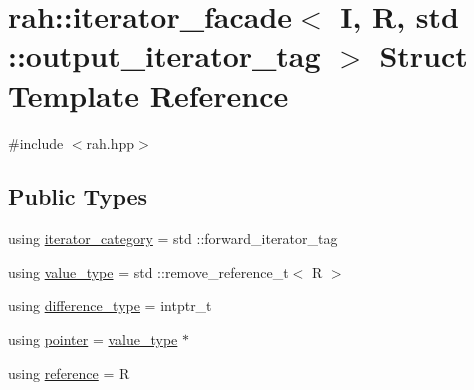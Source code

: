 \hypertarget{structrah_1_1iterator__facade_3_01_i_00_01_r_00_01std_01_1_1output__iterator__tag_01_4}{}\section{rah\+::iterator\+\_\+facade$<$ I, R, std \+::output\+\_\+iterator\+\_\+tag $>$ Struct Template Reference}
\label{structrah_1_1iterator__facade_3_01_i_00_01_r_00_01std_01_1_1output__iterator__tag_01_4}


{\ttfamily \#include $<$rah.\+hpp$>$}

\subsection*{Public Types}
\begin{DoxyCompactItemize}
\item 
using \mbox{\hyperlink{structrah_1_1iterator__facade_3_01_i_00_01_r_00_01std_01_1_1output__iterator__tag_01_4_a465bbb8a7a2ae321b8183e3c9e727423}{iterator\+\_\+category}} = std \+::forward\+\_\+iterator\+\_\+tag
\item 
using \mbox{\hyperlink{structrah_1_1iterator__facade_3_01_i_00_01_r_00_01std_01_1_1output__iterator__tag_01_4_ad112e27b0b6caafdfab6cd47bbc66e73}{value\+\_\+type}} = std \+::remove\+\_\+reference\+\_\+t$<$ R $>$
\item 
using \mbox{\hyperlink{structrah_1_1iterator__facade_3_01_i_00_01_r_00_01std_01_1_1output__iterator__tag_01_4_a3564661cd457ec25b43c0f7a831d1224}{difference\+\_\+type}} = intptr\+\_\+t
\item 
using \mbox{\hyperlink{structrah_1_1iterator__facade_3_01_i_00_01_r_00_01std_01_1_1output__iterator__tag_01_4_aaa99676a12d594e70c36d9c6fc3deb52}{pointer}} = \mbox{\hyperlink{structrah_1_1iterator__facade_3_01_i_00_01_r_00_01std_01_1_1output__iterator__tag_01_4_ad112e27b0b6caafdfab6cd47bbc66e73}{value\+\_\+type}} $\ast$
\item 
using \mbox{\hyperlink{structrah_1_1iterator__facade_3_01_i_00_01_r_00_01std_01_1_1output__iterator__tag_01_4_a372d828166749a15dafbeabecc0674d9}{reference}} = R
\end{DoxyCompactItemize}
